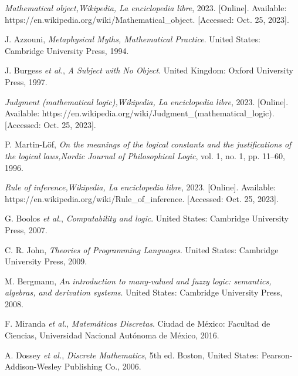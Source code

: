 \begin{thebibliography}{11}
    \label{sec:58}
    \hypertarget{58}{}
    \textit{Mathematical object,}\textit{Wikipedia, La enciclopedia libre}, 2023. [Online]. Available: https://en.wikipedia.org/wiki/Mathematical\_object. [Accessed: Oct. 25, 2023].

    \label{sec:59}
    \hypertarget{59}{}
    J. Azzouni, \textit{Metaphysical Myths, Mathematical Practice}. United States: Cambridge University Press, 1994.

    \label{sec:60}
    \hypertarget{60}{}
    J. Burgess \textit{et al.}, \textit{A Subject with No Object}. United Kingdom: Oxford University Press, 1997.
    
    \label{sec:61}
    \hypertarget{61}{}
    \textit{Judgment (mathematical logic),}\textit{Wikipedia, La enciclopedia libre}, 2023. [Online]. Available: https://en.wikipedia.org/wiki/Judgment\_(mathematical\_logic). [Accessed: Oct. 25, 2023].

    \label{sec:62}
    \hypertarget{62}{}
    P. Martin-Löf, \textit{On the meanings of the logical constants and the justifications of the logical laws,}\textit{Nordic Journal of Philosophical Logic}, vol. 1, no. 1, pp. 11–60, 1996.

    \label{sec:63}
    \hypertarget{63}{}
    \textit{Rule of inference,}\textit{Wikipedia, La enciclopedia libre}, 2023. [Online]. Available: https://en.wikipedia.org/wiki/Rule\_of\_inference. [Accessed: Oct. 25, 2023].

    \label{sec:64}
    \hypertarget{64}{}
    G. Boolos \textit{et al.}, \textit{Computability and logic}. United States: Cambridge University Press, 2007.

    \label{sec:65}
    \hypertarget{65}{}
    C. R. John, \textit{Theories of Programming Languages}. United States: Cambridge University Press, 2009.
    
    \label{sec:66}
    \hypertarget{66}{}
    M. Bergmann, \textit{An introduction to many-valued and fuzzy logic: semantics, algebras, and derivation systems}. United States: Cambridge University Press, 2008.

    \label{sec:67}
    \hypertarget{67}{}
    F. Miranda \textit{et al.}, \textit{Matemáticas Discretas}. Ciudad de México: Facultad de Ciencias, Universidad Nacional Autónoma de México, 2016.

    \label{sec:68}
    \hypertarget{68}{}
    A. Dossey \textit{et al.}, \textit{Discrete Mathematics}, 5th ed. Boston, United States: Pearson-Addison-Wesley Publishing Co., 2006.


\end{thebibliography}
